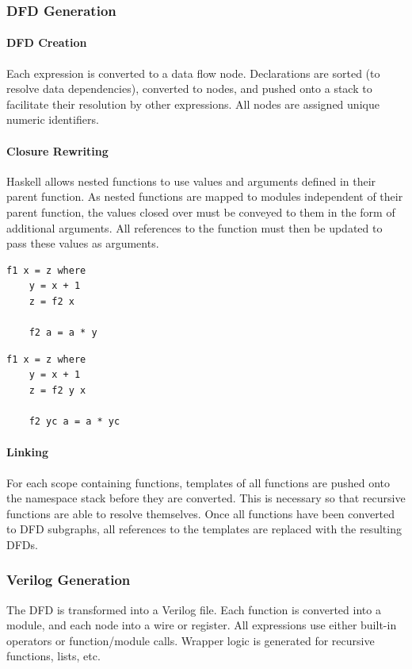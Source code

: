 \documentclass[english,onecolumn]{article}
\begin{document}
\subsubsection{DFD Generation}
\paragraph{DFD Creation}
Each expression is converted to a data flow node. Declarations are sorted (to resolve data dependencies), converted to nodes, and pushed onto a stack to facilitate their resolution by other expressions. All nodes are assigned unique numeric identifiers.

\paragraph{Closure Rewriting}
Haskell allows nested functions to use values and arguments defined in their parent function. As nested functions are mapped to modules independent of their parent function, the values closed over must be conveyed to them in the form of additional arguments.
All references to the function must then be updated to pass these values as arguments.

\begin{lstlisting}[caption={A nested function with a closure.}, label=lst:closure]
f1 x = z where
    y = x + 1
    z = f2 x

    f2 a = a * y
\end{lstlisting}

\begin{lstlisting}[caption={The function from Listing \ref{lst:closure}, rewritten to use arguments.}]
f1 x = z where
    y = x + 1
    z = f2 y x

    f2 yc a = a * yc
\end{lstlisting}

\paragraph{Linking}
For each scope containing functions, templates of all functions are pushed onto the namespace stack before they are converted. This is necessary so that recursive functions are able to resolve themselves. Once all functions have been converted to DFD subgraphs, all references to the templates are replaced with the resulting DFDs.

\subsubsection{Verilog Generation}
The DFD is transformed into a Verilog file. Each function is converted into a module, and each node into a wire or register. All expressions use either built-in operators or function/module calls. Wrapper logic is generated for recursive functions, lists, etc.
\end{document}
